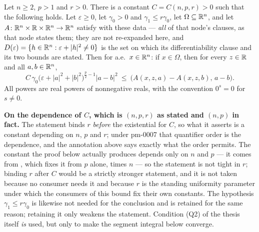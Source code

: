 \begin{helper}
Let $n\ge2$, $p>1$ and $r>0$.  There is a constant $C=C(n,p,r)>0$ such that the
following holds.  Let $\varepsilon\ge0$, let $\gamma_0>0$ and
$\gamma_1\le r\gamma_0$, let $\Omega\subseteq\mathbb{R}^n$, and let
$A\colon\mathbb{R}^n\times\mathbb{R}\times\mathbb{R}^n\to\mathbb{R}^n$ satisfy 
with these data --- \emph{all} of that node's clauses, as that node states them;
they are not re-expanded here, and
$D(\varepsilon)=\{h\in\mathbb{R}^n:\varepsilon+|h|^2\ne0\}$ is the set on which its
differentiability clause and its two bounds are stated.  Then for a.e.\
$x\in\mathbb{R}^n$: if
$x\in\Omega$, then for every $z\in\mathbb{R}$ and all $a,b\in\mathbb{R}^n$,
\[
C\,\gamma_0\bigl(\varepsilon+|a|^2+|b|^2\bigr)^{\frac p2-1}|a-b|^2
\ \le\ \bigl(A(x,z,a)-A(x,z,b),\,a-b\bigr) .
\]
All powers are real powers of nonnegative reals, with the convention
$0^{s}=0$ for $s\ne0$.

\noindent\textbf{On the dependence of $C$, which is $(n,p,r)$ as stated and
$(n,p)$ in fact.}  The statement binds $r$ \emph{before} the existential for
$C$, so what it asserts is a constant depending on $n$, $p$ and $r$; under
pm-0007 that quantifier order is the dependence, and the annotation above says
exactly what the order permits.  The constant the proof below actually produces
depends only on $n$ and $p$ --- it comes from
, which fixes it from $p$ alone, times $n$
--- so the statement is not tight in $r$; binding $r$ after $C$ would be a
strictly stronger statement, and it is not taken because no consumer needs it
and because $r$ is the standing uniformity parameter under which the consumers of
this bound fix their own constants.  The hypothesis $\gamma_1\le r\gamma_0$ is
likewise not needed for the conclusion and is retained for the same reason;
retaining it only weakens the statement.  Condition (Q2) of the thesis itself
\emph{is} used, but only to make the segment integral below converge.
\end{helper}
